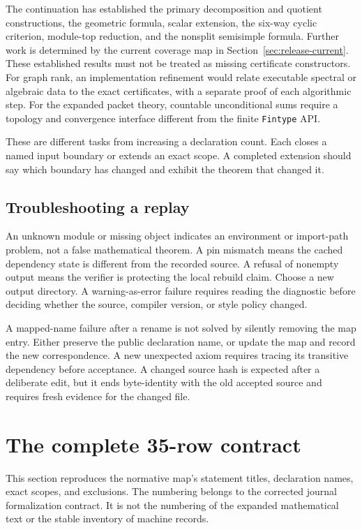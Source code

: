 \documentclass[11pt,a4paper]{article}
\newcommand{\code}[1]{\nolinkurl{#1}}
\begin{document}
The continuation has established the primary decomposition and quotient constructions, the geometric formula, scalar extension, the six-way cyclic criterion, module-top reduction, and the nonsplit semisimple formula. Further work is determined by the current coverage map in Section~\ref{sec:release-current}. These established results must not be treated as missing certificate constructors. For graph rank, an implementation refinement would relate executable spectral or algebraic data to the exact certificates, with a separate proof of each algorithmic step. For the expanded packet theory, countable unconditional sums require a topology and convergence interface different from the finite \code{Fintype} API.

These are different tasks from increasing a declaration count. Each closes a named input boundary or extends an exact scope. A completed extension should say which boundary has changed and exhibit the theorem that changed it.

\subsection{Troubleshooting a replay}

An unknown module or missing object indicates an environment or import-path problem, not a false mathematical theorem. A pin mismatch means the cached dependency state is different from the recorded source. A refusal of nonempty output means the verifier is protecting the local rebuild claim. Choose a new output directory. A warning-as-error failure requires reading the diagnostic before deciding whether the source, compiler version, or style policy changed.

A mapped-name failure after a rename is not solved by silently removing the map entry. Either preserve the public declaration name, or update the map and record the new correspondence. A new unexpected axiom requires tracing its transitive dependency before acceptance. A changed source hash is expected after a deliberate edit, but it ends byte-identity with the old accepted source and requires fresh evidence for the changed file.

\clearpage
\section{The complete 35-row contract}\label{sec:map}

This section reproduces the normative map's statement titles, declaration names, exact scopes, and exclusions. The numbering belongs to the corrected journal formalization contract. It is not the numbering of the expanded mathematical text or the stable inventory of machine records.
\end{document}
